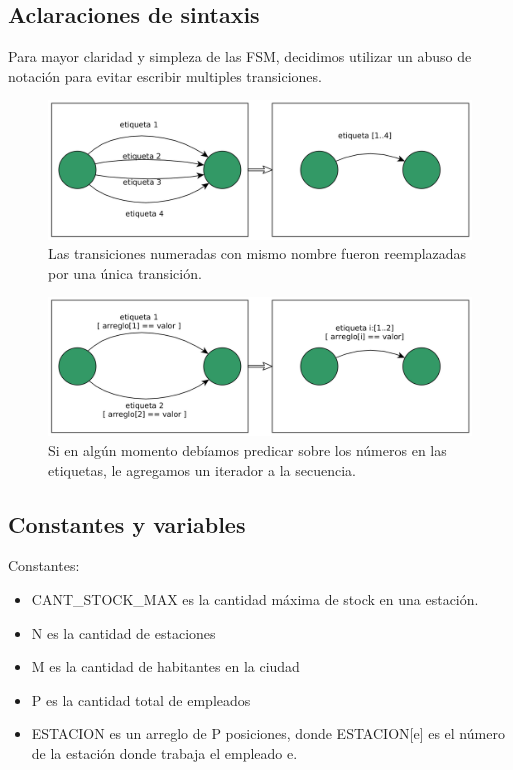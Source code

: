 \subsection{Aclaraciones de sintaxis}

Para mayor claridad y simpleza de las FSM, decidimos utilizar un abuso de notaci\'on para evitar escribir multiples transiciones.

\begin{figure}[H]
	\centering
	\includegraphics[scale=0.35]{imgs/fsm_ej1.png}
	\caption{Las transiciones numeradas con mismo nombre fueron reemplazadas por una \'unica transici\'on.}
\end{figure}

\begin{figure}[H]
	\centering
	\includegraphics[scale=0.35]{imgs/fsm_ej2.png}
	\caption{Si en alg\'un momento deb\'iamos predicar sobre los n\'umeros en las etiquetas, le agregamos un iterador a la secuencia.}
\end{figure}

\subsection{Constantes y variables}

Constantes:
\begin{itemize}
\item CANT\_STOCK\_MAX es la cantidad máxima de stock en una estación. 
\item N es la cantidad de estaciones
\item M es la cantidad de habitantes en la ciudad
\item P es la cantidad total de empleados
\item ESTACION es un arreglo de P posiciones, donde ESTACION[e] es el número de la estación donde trabaja el empleado e.
\end{itemize}

